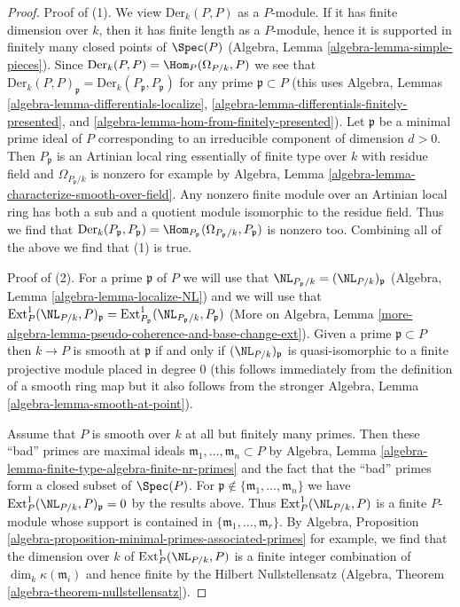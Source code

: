 \begin{proof}
Proof of (1). We view $\text{Der}_k(P, P)$ as a $P$-module.
If it has finite dimension over $k$, then it has finite length
as a $P$-module, hence it is supported in finitely many
closed points of $\Spec(P)$
(Algebra, Lemma \ref{algebra-lemma-simple-pieces}).
Since $\text{Der}_k(P, P) = \Hom_P(\Omega_{P/k}, P)$
we see that
$\text{Der}_k(P, P)_\mathfrak p = \text{Der}_k(P_\mathfrak p, P_\mathfrak p)$
for any prime $\mathfrak p \subset P$
(this uses Algebra, Lemmas
\ref{algebra-lemma-differentials-localize},
\ref{algebra-lemma-differentials-finitely-presented}, and
\ref{algebra-lemma-hom-from-finitely-presented}).
Let $\mathfrak p$ be a minimal prime ideal of $P$
corresponding to an irreducible component of dimension $d > 0$.
Then $P_\mathfrak p$ is an Artinian local ring
essentially of finite type over $k$ with residue field
and $\Omega_{P_\mathfrak p/k}$ is nonzero for example by
Algebra, Lemma \ref{algebra-lemma-characterize-smooth-over-field}.
Any nonzero finite module over an Artinian local ring
has both a sub and a quotient module isomorphic to the residue field.
Thus we find that
$\text{Der}_k(P_\mathfrak p, P_\mathfrak p) =
\Hom_{P_\mathfrak p}(\Omega_{P_\mathfrak p/k}, P_\mathfrak p)$
is nonzero too. Combining all of the above we find that (1) is true.

\medskip\noindent
Proof of (2). For a prime $\mathfrak p$ of $P$ we will use that
$\NL_{P_\mathfrak p/k} = (\NL_{P/k})_\mathfrak p$
(Algebra, Lemma \ref{algebra-lemma-localize-NL})
and we will
use that
$\text{Ext}_P^1(\NL_{P/k}, P)_\mathfrak p =
\text{Ext}_{P_\mathfrak p}^1(\NL_{P_\mathfrak p/k}, P_\mathfrak p)$
(More on Algebra, Lemma
\ref{more-algebra-lemma-pseudo-coherence-and-base-change-ext}).
Given a prime $\mathfrak p \subset P$
then $k \to P$ is smooth at $\mathfrak p$ if and only if
$(\NL_{P/k})_\mathfrak p$ is quasi-isomorphic
to a finite projective module placed in degree $0$ (this follows
immediately from the definition of a smooth ring map but it also
follows from the stronger Algebra, Lemma \ref{algebra-lemma-smooth-at-point}).

\medskip\noindent
Assume that $P$ is smooth over $k$ at all but finitely many primes.
Then these ``bad'' primes are maximal ideals
$\mathfrak m_1, \ldots, \mathfrak m_n \subset P$ by
Algebra, Lemma \ref{algebra-lemma-finite-type-algebra-finite-nr-primes}
and the fact that the ``bad'' primes form a closed subset of $\Spec(P)$.
For $\mathfrak p \not \in \{\mathfrak m_1, \ldots, \mathfrak m_n\}$
we have $\text{Ext}^1_P(\NL_{P/k}, P)_\mathfrak p = 0$ by the results above.
Thus $\text{Ext}^1_P(\NL_{P/k}, P)$ is a finite $P$-module
whose support is contained in $\{\mathfrak m_1, \ldots, \mathfrak m_r\}$.
By Algebra, Proposition
\ref{algebra-proposition-minimal-primes-associated-primes}
for example, we find that the dimension over $k$ of
$\text{Ext}^1_P(\NL_{P/k}, P)$ is a finite integer combination
of $\dim_k \kappa(\mathfrak m_i)$ and hence finite by
the Hilbert Nullstellensatz
(Algebra, Theorem \ref{algebra-theorem-nullstellensatz}).
\end{proof}

